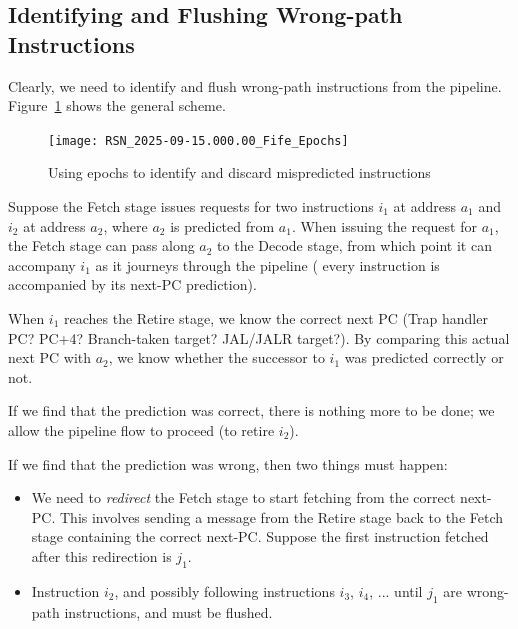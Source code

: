 
\subsection{Identifying and Flushing Wrong-path Instructions}

Clearly, we need to identify and flush wrong-path instructions from
the pipeline.  Figure~\ref{Fig_RISCV_Epochs} shows the general scheme.
\begin{figure}[htbp]
  \centerline{\texttt{[image: RSN\_2025-09-15.000.00\_Fife\_Epochs]}}
  \caption{\label{Fig_RISCV_Epochs}
           Using epochs to identify and discard mispredicted instructions}
\end{figure}

Suppose the Fetch stage issues requests for two instructions $i_1$ at
address $a_1$ and $i_2$ at address $a_2$, where $a_2$ is predicted
from $a_1$.  When issuing the request for $a_1$, the Fetch stage can
pass along $a_2$ to the Decode stage, from which point it can
accompany $i_1$ as it journeys through the pipeline ({\ie} every
instruction is accompanied by its next-PC prediction).

When $i_1$ reaches the Retire stage, we know the correct next PC (Trap
handler PC?  PC+4?  Branch-taken target?  JAL/JALR target?).  By
comparing this actual next PC with $a_2$, we know whether the
successor to $i_1$ was predicted correctly or not.

If we find that the prediction was correct, there is nothing more to
be done; we allow the pipeline flow to proceed (to retire $i_2$).


If we find that the prediction was wrong, then two things must happen:

\begin{itemize}

  \item We need to \emph{redirect} the Fetch stage to start fetching
    from the correct next-PC.  This involves sending a message from
    the Retire stage back to the Fetch stage containing the correct
    next-PC.  Suppose the first instruction fetched after this
    redirection is $j_1$.

  \item Instruction $i_2$, and possibly following instructions $i_3$,
    $i_4$, ... until $j_1$ are wrong-path instructions, and must be
    flushed.

\end{itemize}

